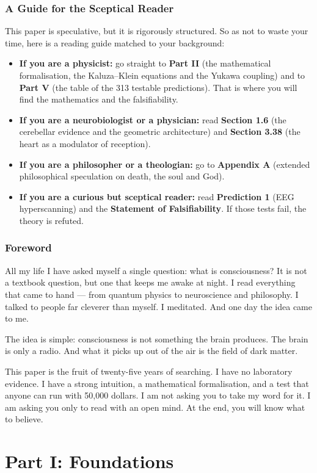 \documentclass[11pt,a4paper]{article}
\begin{document}
\section*{A Guide for the Sceptical Reader}
This paper is speculative, but it is rigorously structured. So as not to waste your time, here is a reading guide matched to your background:
\begin{itemize}
    \item \textbf{If you are a physicist:} go straight to \textbf{Part II} (the mathematical formalisation, the Kaluza--Klein equations and the Yukawa coupling) and to \textbf{Part V} (the table of the 313 testable predictions). That is where you will find the mathematics and the falsifiability.
    \item \textbf{If you are a neurobiologist or a physician:} read \textbf{Section 1.6} (the cerebellar evidence and the geometric architecture) and \textbf{Section 3.38} (the heart as a modulator of reception).
    \item \textbf{If you are a philosopher or a theologian:} go to \textbf{Appendix A} (extended philosophical speculation on death, the soul and God).
    \item \textbf{If you are a curious but sceptical reader:} read \textbf{Prediction 1} (EEG hyperscanning) and the \textbf{Statement of Falsifiability}. If those tests fail, the theory is refuted.
\end{itemize}

\section*{Foreword}
All my life I have asked myself a single question: what is consciousness? It is not a textbook question, but one that keeps me awake at night. I read everything that came to hand --- from quantum physics to neuroscience and philosophy. I talked to people far cleverer than myself. I meditated. And one day the idea came to me.

The idea is simple: consciousness is not something the brain produces. The brain is only a radio. And what it picks up out of the air is the field of dark matter.

This paper is the fruit of twenty-five years of searching. I have no laboratory evidence. I have a strong intuition, a mathematical formalisation, and a test that anyone can run with 50,000 dollars. I am not asking you to take my word for it. I am asking you only to read with an open mind. At the end, you will know what to believe.

\newpage
\part*{Part I: Foundations}
\end{document}
